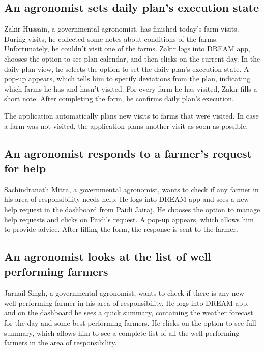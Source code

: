 
\subsection*{An agronomist sets daily plan's execution state}
Zakir Hussain, a governmental agronomist, has finished today's farm visits. During visits, he collected some notes about conditions of the farms. Unfortunately, he couldn't visit one of the farms. Zakir logs into DREAM app, chooses the option to see plan calendar, and then clicks on the current day. In the daily plan view, he selects the option to set the daily plan's execution state. A pop-up appears, which tells him to specify deviations from the plan, indicating which farms he has and hasn't visited. For every farm he has visited, Zakir fills a short note. After completing the form, he confirms daily plan's execution.

The application automatically plans new visits to farms that were visited. In case a farm was not visited, the application plans another visit as soon as possible.

\subsection*{An agronomist responds to a farmer’s request for help} 
Sachindranath Mitra, a governmental agronomist, wants to check if any farmer in his area of responsibility needs help. He logs into DREAM app and sees a new help request in the dashboard from Paidi Jairaj. He chooses the option to manage help requests and clicks on Paidi's request. A pop-up appears, which allows him to provide advice. After filling the form, the response is sent to the farmer.

\subsection*{An agronomist looks at the list of well performing farmers}
Jarnail Singh, a governmental agronomist, wants to check if there is any new well-performing farmer in his area of responsibility. He logs into DREAM app, and on the dashboard he sees a quick summary, containing the weather forecast for the day and some best performing farmers. He clicks on the option to see full summary, which allows him to see a complete list of all the well-performing farmers in the area of responsibility. 

